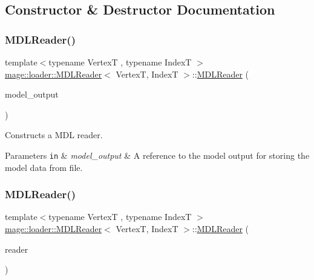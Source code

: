 \subsection{Constructor \& Destructor Documentation}
\hypertarget{classmage_1_1loader_1_1_m_d_l_reader_add63da01957e6a3a9b9ba38dbab70e11}{}\label{classmage_1_1loader_1_1_m_d_l_reader_add63da01957e6a3a9b9ba38dbab70e11} 
\subsubsection{\texorpdfstring{M\+D\+L\+Reader()}{MDLReader()}\hspace{0.1cm}{\footnotesize\ttfamily [1/3]}}
{\footnotesize\ttfamily template$<$typename VertexT , typename IndexT $>$ \\
\hyperlink{classmage_1_1loader_1_1_m_d_l_reader}{mage\+::loader\+::\+M\+D\+L\+Reader}$<$ VertexT, IndexT $>$\+::\hyperlink{classmage_1_1loader_1_1_m_d_l_reader}{M\+D\+L\+Reader} (\begin{DoxyParamCaption}\item[{\hyperlink{structmage_1_1_model_output}{Model\+Output}$<$ VertexT, IndexT $>$ \&}]{model\+\_\+output }\end{DoxyParamCaption})\hspace{0.3cm}{\ttfamily [explicit]}}

Constructs a M\+DL reader.


\begin{DoxyParams}[1]{Parameters}
\mbox{\tt in}  & {\em model\+\_\+output} & A reference to the model output for storing the model data from file. \\
\hline
\end{DoxyParams}
\hypertarget{classmage_1_1loader_1_1_m_d_l_reader_ae61041f898326f33e39391feed84114a}{}\label{classmage_1_1loader_1_1_m_d_l_reader_ae61041f898326f33e39391feed84114a} 
\subsubsection{\texorpdfstring{M\+D\+L\+Reader()}{MDLReader()}\hspace{0.1cm}{\footnotesize\ttfamily [2/3]}}
{\footnotesize\ttfamily template$<$typename VertexT , typename IndexT $>$ \\
\hyperlink{classmage_1_1loader_1_1_m_d_l_reader}{mage\+::loader\+::\+M\+D\+L\+Reader}$<$ VertexT, IndexT $>$\+::\hyperlink{classmage_1_1loader_1_1_m_d_l_reader}{M\+D\+L\+Reader} (\begin{DoxyParamCaption}\item[{const \hyperlink{classmage_1_1loader_1_1_m_d_l_reader}{M\+D\+L\+Reader}$<$ VertexT, IndexT $>$ \&}]{reader }\end{DoxyParamCaption})\hspace{0.3cm}{\ttfamily [delete]}}

